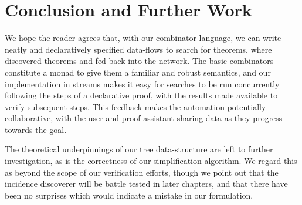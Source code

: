 



\section{Conclusion and Further Work}
We hope the reader agrees that, with our combinator language, we can write neatly and declaratively specified data-flows to search for theorems, where discovered theorems and fed back into the network. The basic combinators constitute a monad to give them a familiar and robust semantics, and our implementation in streams makes it easy for searches to be run concurrently following the steps of a declarative proof, with the results made available to verify subsequent steps. This feedback makes the automation potentially collaborative, with the user and proof assistant sharing data as they progress towards the goal.

The theoretical underpinnings of our tree data-structure are left to further investigation, as is the correctness of our simplification algorithm. We regard this as beyond the scope of our verification efforts, though we point out that the incidence discoverer will be battle tested in later chapters, and that there have been no surprises which would indicate a mistake in our formulation.

